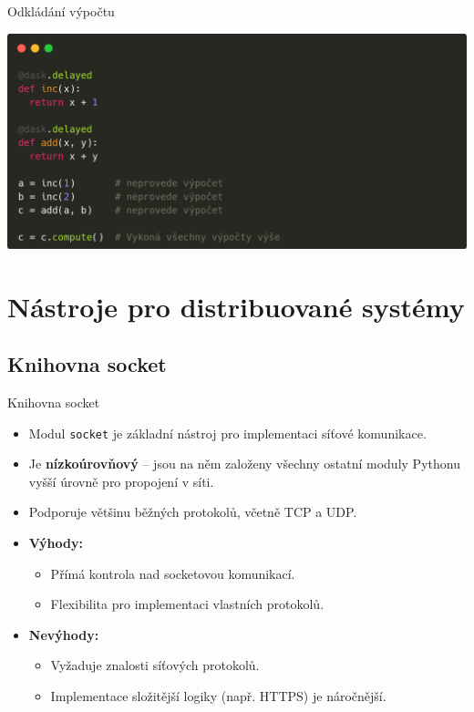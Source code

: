 \documentclass{beamer}
\begin{document}
\begin{frame}{Odkládání výpočtu}

  
  
    \begin{center}
        \includegraphics[width=\textwidth]{obrazky/codes/carbon16.png}
    \end{center}
\end{frame}

\section{Nástroje pro distribuované systémy}
\subsection{Knihovna socket}
\begin{frame}{Knihovna socket}
	\begin{itemize}
		\item Modul \texttt{socket} je základní nástroj pro implementaci síťové komunikace.
		\item Je \textbf{nízkoúrovňový} – jsou na něm založeny všechny ostatní moduly Pythonu vyšší úrovně pro propojení v síti.
		\item Podporuje většinu běžných protokolů, včetně TCP a UDP.
		\item \textbf{Výhody:}
		\begin{itemize}
			\item Přímá kontrola nad socketovou komunikací.
			\item Flexibilita pro implementaci vlastních protokolů.
		\end{itemize}
		\item \textbf{Nevýhody:}
		\begin{itemize}
			\item Vyžaduje znalosti síťových protokolů.
			\item Implementace složitější logiky (např. HTTPS) je náročnější.
		\end{itemize}
	\end{itemize}
\end{frame}
\end{document}
